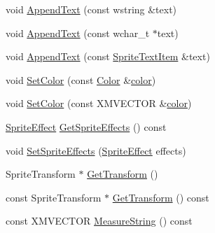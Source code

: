 \begin{DoxyCompactItemize}
\item 
void \hyperlink{classmage_1_1_sprite_text_acf993532a7b2e6ebb761b9b47cbdba98}{Append\+Text} (const wstring \&text)
\item 
void \hyperlink{classmage_1_1_sprite_text_a462809b9138f94720f972505a4f74d81}{Append\+Text} (const wchar\+\_\+t $\ast$text)
\item 
void \hyperlink{classmage_1_1_sprite_text_a6f0bb93c634d9b05466d3998bcaf957a}{Append\+Text} (const \hyperlink{structmage_1_1_sprite_text_item}{Sprite\+Text\+Item} \&text)
\item 
void \hyperlink{classmage_1_1_sprite_text_acaeb6686d0a5d89d799dd3ac4390a242}{Set\+Color} (const \hyperlink{structmage_1_1_color}{Color} \&\hyperlink{namespacemage_a56eceea5a9bceb2b56073f3ea4945781}{color})
\item 
void \hyperlink{classmage_1_1_sprite_text_ab3930318d6dca0589de4490ed629a3b8}{Set\+Color} (const X\+M\+V\+E\+C\+T\+OR \&\hyperlink{namespacemage_a56eceea5a9bceb2b56073f3ea4945781}{color})
\item 
\hyperlink{namespacemage_a9cfe18123066ba4236f548f9de75d881}{Sprite\+Effect} \hyperlink{classmage_1_1_sprite_text_a8a97ddf71ed3fd656f0f21b981f8e905}{Get\+Sprite\+Effects} () const
\item 
void \hyperlink{classmage_1_1_sprite_text_aedce1cc8bca6f038b618044ddfadcf6a}{Set\+Sprite\+Effects} (\hyperlink{namespacemage_a9cfe18123066ba4236f548f9de75d881}{Sprite\+Effect} effects)
\item 
Sprite\+Transform $\ast$ \hyperlink{classmage_1_1_sprite_text_a1ba88df7fac17dc88d958fa4a841b7f1}{Get\+Transform} ()
\item 
const Sprite\+Transform $\ast$ \hyperlink{classmage_1_1_sprite_text_a6e2baafdb30e47405f6199ca24194934}{Get\+Transform} () const
\item 
const X\+M\+V\+E\+C\+T\+OR \hyperlink{classmage_1_1_sprite_text_a72f926162887270cef780251561a2155}{Measure\+String} () const
\end{DoxyCompactItemize}
